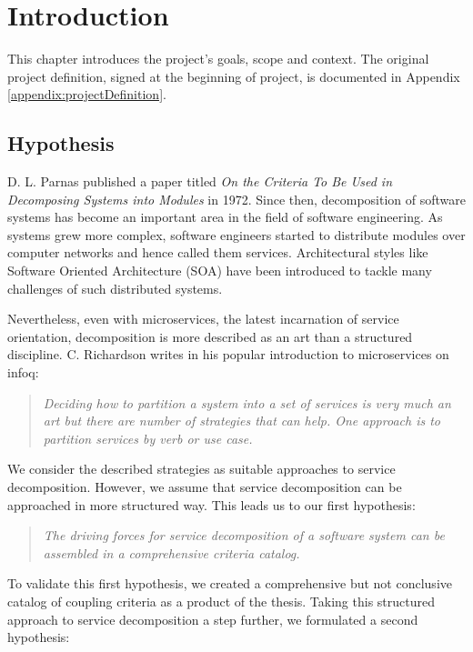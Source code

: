 \chapter{Introduction}

This chapter introduces the project's goals, scope and context. The original project definition, signed at the beginning of project, is documented in Appendix \ref{appendix:projectDefinition}.

\section{Hypothesis}

D. L. Parnas published a paper titled \textit{On the Criteria To Be Used in Decomposing Systems into Modules}\cite{parnaDecomposing} in 1972. Since then, decomposition of software systems has become an important area in the field of software engineering. As systems grew more complex, software engineers started to distribute modules over computer networks and hence called them services. Architectural styles like Software Oriented Architecture (SOA) have been introduced to tackle many challenges of such distributed systems.

Nevertheless, even with microservices, the latest incarnation of service orientation, decomposition is more described as an art than a structured discipline. C. Richardson writes in his popular introduction to microservices on \gls{infoq}:

\begin{quote}
	\textit{Deciding how to partition a system into a set of services is very much an art but there are number of strategies that can help. One approach is to partition services by verb or use case.}\cite{richardson2014microservices}
\end{quote}

We consider the described strategies as suitable approaches to service decomposition. However, we assume that service decomposition can be approached in more structured way. This leads us to our first hypothesis:

\begin{quote}
	\textit{The driving forces for service decomposition of a software system can be assembled in a comprehensive criteria catalog.}
\end{quote}

To validate this first hypothesis, we created a comprehensive but not conclusive catalog of coupling criteria as a product of the thesis. Taking this structured approach to service decomposition a step further, we formulated a second hypothesis:

